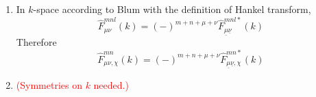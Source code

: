 \begin{enumerate}
\item In $k$-space according to Blum \citep{Blum_I} with the definition
of Hankel transform,
\begin{equation}
\hat{F}_{\mu\nu}^{mnl}(k)=\left(-\right)^{m+n+\mu+\nu}\hat{F}_{\underline{\mu}\underline{\nu}}^{mnl*}(k)\label{eq:rot-invar-symm-k-l}
\end{equation}
Therefore
\begin{equation}
\hat{F}_{\mu\nu,\chi}^{mn}(k)=\left(-\right)^{m+n+\mu+\nu}\hat{F}_{\underline{\mu}\underline{\nu},\chi}^{mn*}(k)\label{eq:rot-invar-symm-k-chi}
\end{equation}
\item \textcolor{red}{(Symmetries on $k$ needed.)}
\end{enumerate}

